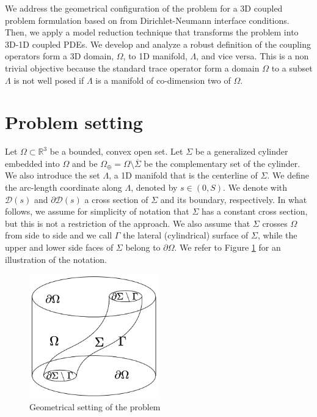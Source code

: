 \documentclass[r]{siamart171218}
\begin{document}
We address the geometrical configuration of the problem for a 3D coupled problem formulation based on from Dirichlet-Neumann interface conditions. Then, we apply a model reduction technique that transforms the problem into 3D-1D coupled PDEs. We develop and analyze a robust definition of the coupling operators form a 3D domain, $\Omega$, to 1D manifold, $\Lambda$, and vice versa. This is a non trivial objective because the standard trace operator form a domain $\Omega$ to a subset $\Lambda$ is not well posed if $\Lambda$ is a manifold of co-dimension two of $\Omega$.

\section{Problem setting}\label{sec:setting}

Let $\Omega \subset \mathbb{R}^3$ be a bounded, convex open set. Let $\Sigma$ be a generalized cylinder embedded into $\Omega$ and be $\Omega_\oplus = \Omega \setminus \overline{\Sigma}$ be the complementary set of the cylinder. We also introduce the set $\Lambda$, a 1D manifold that is the centerline of $\Sigma$. We define the arc-length coordinate along $\Lambda$, denoted by $s \in (0,S)$. We denote with $\mathcal{D}(s)$ and $\partial\mathcal{D}(s)$ a cross section of $\Sigma$ and its boundary, respectively. In what follows, we assume for simplicity of notation that $\Sigma$ has a constant cross section, but this is not a restriction of the approach. We also assume that $\Sigma$ crosses $\Omega$ from side to side and we call $\Gamma$ the lateral (cylindrical) surface of $\Sigma$, while the upper and lower side faces of $\Sigma$ belong to $\partial\Omega$. We refer to Figure \ref{fig1} for an illustration of the notation. 

\begin{figure}
\begin{center}
\includegraphics[width=0.5\textwidth]{3D-1D-simple.png}
\end{center}
\caption{Geometrical setting of the problem}
\label{fig1}
\end{figure}
\end{document}
